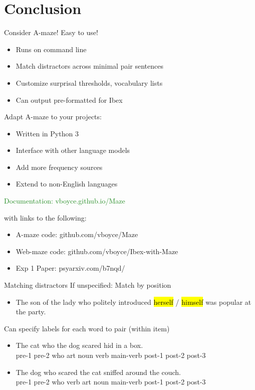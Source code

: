 \documentclass[ 12pt, xcolor=beamer,table,usenames,dvipsnames, ignorenonframetext, ngerman]{beamer}
\makeatletter
\let\HL\hl
\renewcommand\hl{%
	\let\set@color\beamerorig@set@color
	\let\reset@color\beamerorig@reset@color
	\HL}
\makeatother
\begin{document}
\section{Conclusion}

\begin{frame}{Consider A-maze!}
Easy to use! \pause
\begin{itemize}
	\item Runs on command line \pause
	\item Match distractors across minimal pair sentences \pause
	\item Customize surprisal thresholds, vocabulary lists \pause
	\item Can output pre-formatted for Ibex\pause
\end{itemize}

Adapt A-maze to your projects:
\begin{itemize}
	\item Written in Python 3 
	\item Interface with other language models 
	\item Add more frequency sources 
	\item Extend to non-English languages
\end{itemize}
\medskip
\end{frame}


\begin{frame}{}

\textcolor{ForestGreen}{\large Documentation: vboyce.github.io/Maze}

with links to the following:
\begin{itemize}

\item A-maze code: github.com/vboyce/Maze

\item Web-maze code: github.com/vboyce/Ibex-with-Maze

\item Exp 1 Paper: psyarxiv.com/b7nqd/
\end{itemize}
\end{frame}


\appendix

\begin{frame}{Matching distractors}
If unspecified: Match by position
\begin{itemize}
	\item The son of the lady who politely introduced  \hl{herself} / \hl{himself} was popular at the party.
\end{itemize}
Can specify labels for each word to pair (within item)
\begin{itemize}
	\item The cat who the dog scared hid in a box.\\pre-1 pre-2 who art noun verb main-verb post-1 post-2 post-3
\item The dog who scared the cat sniffed around the couch.\\ pre-1 pre-2 who verb art noun main-verb post-1 post-2 post-3
\end{itemize}
\end{frame}
\end{document}

